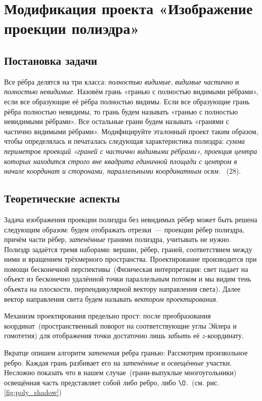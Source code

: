 \section{Модификация проекта «Изображение проекции полиэдра»}

\subsection{Постановка задачи}

Все рёбра делятся на три класса: \emph{полностью видимые}, \emph{видимые частично} и \emph{полностью невидимые}. Назовём грань «гранью с полностью видимыми рёбрами», если все образующие её рёбра полностью видимы. Если все образующие грань рёбра полностью невидимы, то грань будем называть «гранью с полностью невидимыми рёбрами». Все остальные грани будем называть «гранями с частично видимыми рёбрами». Модифицируйте эталонный проект таким образом, чтобы определялась и печаталась следующая характеристика полиэдра: \emph{сумма периметров проекций «граней с частично видимыми рёбрами», проекция центра которых находится строго вне квадрата единичной площади с центром в начале координат и сторонами, параллельными координатным осям}.
~(28).

\subsection{Теоретические аспекты}

Задача изображения проекции полиэдра без невидимых рёбер может быть решена следующим образом: будем отображать отрезки~--- проекции рёбер полиэдра, причём части рёбер, \emph{затенённые} гранями полиэдра, учитывать не нужно.
Полиэдр задаётся тремя наборами: вершин, рёбер, граней, соответствием между ними и вращением трёхмерного пространства. Проектирование производится при помощи бесконечной перспективы~(Физическая интерпретация: свет падает на объект из бесконечно удалённой точки параллельным потоком и мы видим тень объекта на плоскости, перпендикулярной вектору направления света). Далее вектор направления света будем называть \emph{вектором проектирования}.

Механизм проектирования предельно прост: после преобразования координат~(пространственный поворот на соответствующие углы Эйлера и гомотетия) для отображения точки достаточно лишь \emph{забыть} её $z$-координату.

Вкратце опишем алгоритм \emph{затенения} ребра гранью:
Рассмотрим произвольное ребро. Каждая грань разбивает его на \emph{затенённые} и \emph{освещённые} участки. Несложно показать что в нашем случае~(грани-выпуклые многоугольники) освещённая часть представляет собой либо ребро, либо $\O$.~(см. рис.\ref{fig:poly_shadow})

